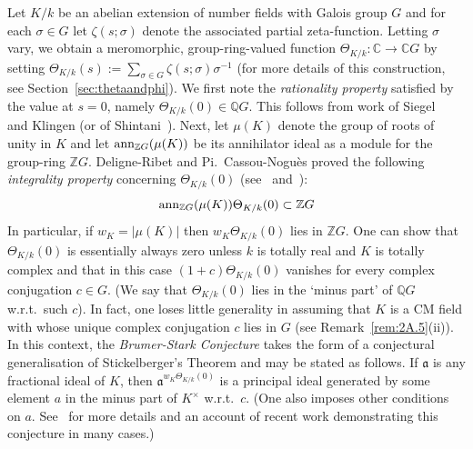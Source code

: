 \documentclass[12pt]{article}
\newcounter{rem}[section]%
\newcommand{\bbC}{\ensuremath{\mathbb{C}}}
\newcommand{\bbQ}{\ensuremath{\mathbb{Q}}}
\newcommand{\bbZ}{\ensuremath{\mathbb{Z}}}
\newcommand{\beql}[1]{\begin{equation}\label{#1}}
\newcommand{\eeq}{\end{equation}}
\newcommand{\fa}{\ensuremath{\mathfrak{a}}}
\newcommand{\inv}{^{-1}}%
\newcommand{\rem}{\refstepcounter{rem}\noindent{\sc Remark \therem}}%
\renewcommand{\therem}{\thesection.\arabic{rem}}
\newcommand{\ThetaKk}{\ensuremath{\Theta_{K/k}}}
\begin{document}
Let $K/k$ be an abelian extension of number fields with Galois group $G$ and
for each $\sigma\in G$ let $\zeta(s;\sigma)$ denote the associated partial zeta-function.
Letting $\sigma$ vary, we obtain a meromorphic, group-ring-valued function
$\Theta_{K/k}:\bbC\rightarrow \bbC G$ by setting
$\Theta_{K/k}(s):=\sum_{\sigma\in G}\zeta(s;\sigma)\sigma\inv$
(for more details of this construction, see Section~\ref{sec:thetaandphi}).
We first note the \emph{rationality property} satisfied by the value at $s=0$, namely
$\Theta_{K/k}(0)\in\bbQ G$. This
follows from work of Siegel~\cite{Si} and Klingen (or of
Shintani~\cite[Cor. to Thm. 1]{Shi}).
Next, let $\mu(K)$ denote the group of roots of unity in $K$
and let ${\rm ann}_{\bbZ G}(\mu(K))$ be its annihilator ideal as a module for the
group-ring $\bbZ G$.
Deligne-Ribet and Pi.~Cassou-Nogu\`es proved the following
\emph{integrality property} concerning
$\Theta_{K/k}(0)$ (see~\cite{D-R} and~\cite{CN}):
\beql{eq:introA}
{\rm ann}_{\bbZ G}(\mu(K))\ThetaKk(0)\subset\bbZ G
\eeq
In particular, if $w_K=|\mu(K)|$ then  $w_K\ThetaKk(0)$ lies in $\bbZ G$.
One can show that $\Theta_{K/k}(0)$ is essentially always zero unless
$k$ is totally real and $K$ is totally complex and that in this case  $(1+c)\Theta_{K/k}(0)$
vanishes for every complex conjugation $c\in G$.
(We say that $\Theta_{K/k}(0)$ lies in the `minus part' of $\bbQ G$ w.r.t.\ such $c$).
In fact, one loses little generality in assuming that $K$ is a CM field with
whose unique complex conjugation $c$ lies in $G$ (see Remark~\ref{rem:2A.5}(ii)).
In this context,
the \emph{Brumer-Stark Conjecture} takes the form of
a conjectural generalisation of Stickelberger's Theorem
and may be stated as follows. If $\fa$ is any fractional ideal of $K$, then
$\fa^{w_K\ThetaKk(0)}$ is a principal ideal generated by some element $a$ in the minus part
of $K^\times$ w.r.t.\ $c$.
(One also imposes other conditions on $a$. See~\cite{Gr} for more details
and an account of recent work demonstrating this conjecture in many cases.)
\end{document}
